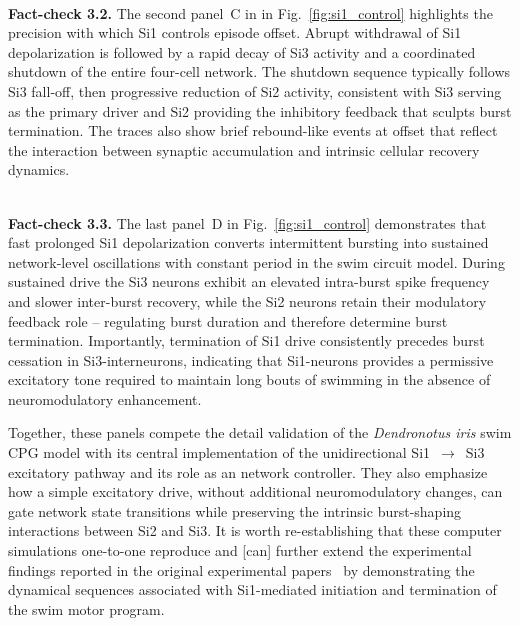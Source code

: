 \documentclass[nofootinbib,aip,amsmath,amssymb,reprint,twocolumn,10pt]{revtex4-2}
\begin{document}
 ~\\
{\bf Fact-check 3.2.} The second panel~C in in Fig.~\ref{fig:si1_control} highlights the precision with which Si1 controls episode offset. Abrupt withdrawal of Si1 depolarization is followed by a rapid decay of Si3 activity and a coordinated shutdown of the entire four-cell network. The shutdown sequence typically follows Si3 fall-off, then progressive reduction of Si2 activity, consistent with Si3 serving as the primary driver and Si2 providing the inhibitory feedback that sculpts burst termination. The traces also show brief rebound-like events at offset that reflect the interaction between synaptic accumulation and intrinsic cellular recovery dynamics.

 ~\\
{\bf Fact-check 3.3.} The last panel~D in Fig.~\ref{fig:si1_control} demonstrates that fast prolonged Si1 depolarization converts intermittent bursting into sustained network-level oscillations with constant period in the swim circuit model. During sustained drive the Si3 neurons exhibit an elevated intra-burst spike frequency and slower inter-burst recovery, while the Si2 neurons retain their modulatory feedback role -- regulating burst duration and therefore determine burst termination. Importantly, termination of Si1 drive consistently precedes burst cessation in Si3-interneurons, indicating that Si1-neurons  provides a permissive excitatory tone required to maintain long bouts of swimming in the absence of neuromodulatory enhancement.

Together, these panels compete the detail validation of the {\em Dendronotus iris} swim CPG model with its central implementation of the unidirectional Si1~$\to$~Si3 excitatory pathway and its role as an network controller. They also emphasize how a simple excitatory drive, without additional neuromodulatory changes, can gate network state transitions while preserving the intrinsic burst-shaping interactions between Si2 and Si3. It is worth re-establishing that these computer simulations one-to-one reproduce and [can] further extend the experimental findings reported in the original experimental papers~\cite{sakurai2019command, SakuraiKatz2016} by demonstrating the dynamical sequences associated with Si1-mediated initiation and termination of the swim motor program.
\end{document}
